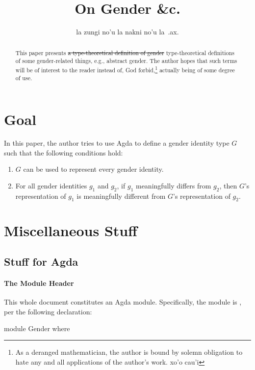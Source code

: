 \documentclass{article}
\title{On Gender \&c.}
\author{la zungi no'u la nakni no'u la\ .ax.}
\begin{document}
\maketitle{}

\begin{abstract}
\sloppypar{}
This paper presents \st{a type-theoretical definition of gender} type-theoretical definitions of some gender-related things, e.g., abstract gender.  The author hopes that such terms will be of interest to the reader instead of, God forbid,\footnote{As a deranged mathematician, the author is bound by solemn obligation to hate any and all applications of the author's work.  xo'o cau'i} actually being of some degree of use.
\end{abstract}

\section{Goal}
In this paper, the author tries to use Agda to define a gender identity type \(G\) such that the following conditions hold:

\begin{enumerate}
  \item \(G\) can be used to represent every gender identity.
  \item For all gender identities \(g_1\) and \(g_2\), if \(g_1\) meaningfully differs from \(g_2\), then \(G\)'s representation of \(g_1\) is meaningfully different from \(G\)'s representation of \(g_2\).\label{enum:specRuleRepresentationDifference}
\end{enumerate}


\section{Miscellaneous Stuff}

\subsection{Stuff for Agda}

\paragraph{The Module Header}
This whole document constitutes an Agda module.  Specifically, the module is , per the following declaration:

\begin{code}
module Gender where
\end{code}
\end{document}
